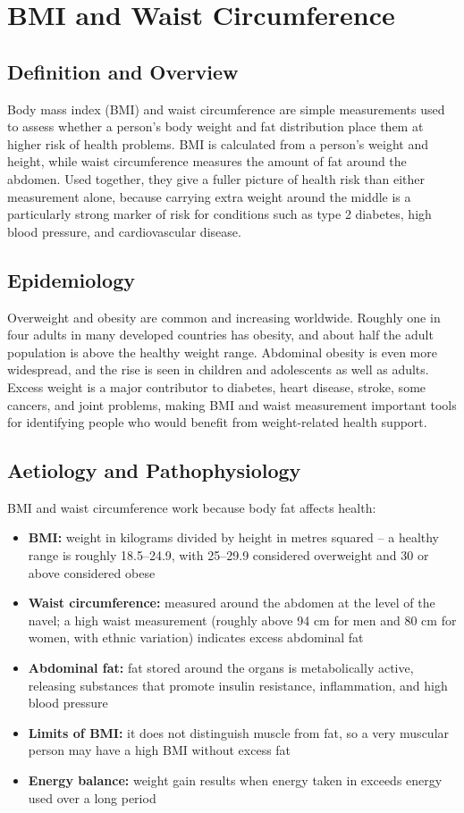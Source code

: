 \chapter{BMI and Waist Circumference}

\section*{Definition and Overview}
Body mass index (BMI) and waist circumference are simple measurements used to assess whether a person's body weight and fat distribution place them at higher risk of health problems. BMI is calculated from a person's weight and height, while waist circumference measures the amount of fat around the abdomen. Used together, they give a fuller picture of health risk than either measurement alone, because carrying extra weight around the middle is a particularly strong marker of risk for conditions such as type 2 diabetes, high blood pressure, and cardiovascular disease.

\section*{Epidemiology}
Overweight and obesity are common and increasing worldwide. Roughly one in four adults in many developed countries has obesity, and about half the adult population is above the healthy weight range. Abdominal obesity is even more widespread, and the rise is seen in children and adolescents as well as adults. Excess weight is a major contributor to diabetes, heart disease, stroke, some cancers, and joint problems, making BMI and waist measurement important tools for identifying people who would benefit from weight-related health support.

\section*{Aetiology and Pathophysiology}
BMI and waist circumference work because body fat affects health:

\begin{itemize}
    \item \textbf{BMI:} weight in kilograms divided by height in metres squared -- a healthy range is roughly 18.5--24.9, with 25--29.9 considered overweight and 30 or above considered obese
    \item \textbf{Waist circumference:} measured around the abdomen at the level of the navel; a high waist measurement (roughly above 94 cm for men and 80 cm for women, with ethnic variation) indicates excess abdominal fat
    \item \textbf{Abdominal fat:} fat stored around the organs is metabolically active, releasing substances that promote insulin resistance, inflammation, and high blood pressure
    \item \textbf{Limits of BMI:} it does not distinguish muscle from fat, so a very muscular person may have a high BMI without excess fat
    \item \textbf{Energy balance:} weight gain results when energy taken in exceeds energy used over a long period
\end{itemize}

